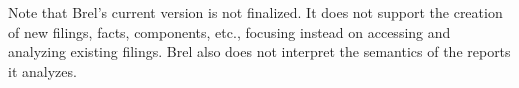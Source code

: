 Note that Brel's current version is not finalized. 
It does not support the creation of new filings, facts, components, etc., 
focusing instead on accessing and analyzing existing filings. 
Brel also does not interpret the semantics of the reports it analyzes.

